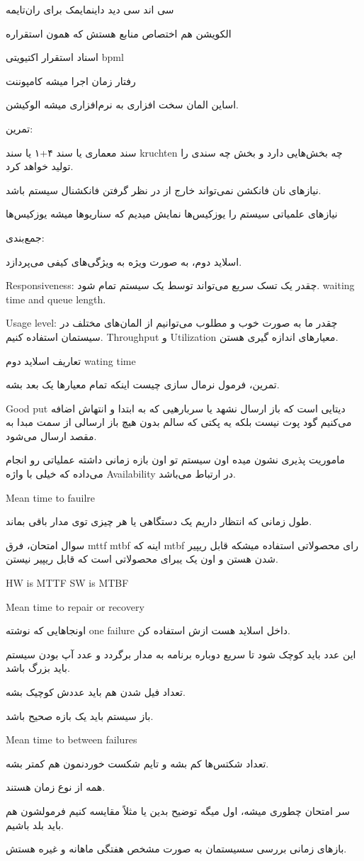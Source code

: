 سی اند سی دید داینمایمک برای ران‌تایمه

الکویشن هم اختصاص منابع هستش که همون استقراره

اسناد
استقرار
اکتیویتی
bpml

رفتار زمان اجرا میشه کامپوننت

اساین المان سخت افزاری به نرم‌افزاری میشه الوکیشن.

تمرین:

سند معماری یا سند ۴+۱ یا سند kruchten چه بخش‌هایی دارد و بخش چه سندی را تولید
خواهد کرد.

نیاز‌های نان فانکشن نمی‌تواند خارج از در نظر گرفتن فانکشنال سیستم باشد.

نیاز‌های علمیاتی سیستم را یوزکیس‌ها نمایش میدیم که سناریو‌ها میشه یوزکیس‌ها

جمع‌بندی:

اسلاید دوم، به صورت ویژه به ویژگی‌های کیفی می‌پردازد.

Responsiveness: چقدر یک تسک سریع می‌تواند توسط یک سیستم تمام شود. waiting time
and queue length.

Usage level: چقدر ما به صورت خوب و مطلوب می‌توانیم از المان‌های مختلف در سیستمان
استفاده کنیم. Throughput و Utilization معیار‌های اندازه گیری هستن.

تعاریف اسلاید دوم wating time

تمرین، فرمول نرمال سازی چیست اینکه تمام معیار‌ها یک بعد بشه.

Good put دیتایی است که باز ارسال نشهد یا سربارهیی که به ابتدا و انتهاش اضافه
می‌کنیم گود پوت نیست بلکه یه پکتی که سالم بدون هیچ باز ارسالی از سمت مبدا به
مقصد ارسال می‌شود.

ماموریت پذیری نشون میده اون سیستم تو اون بازه زمانی داشته عملیاتی رو انجام
می‌داده که خیلی با واژه Availability در ارتباط می‌باشد.

Mean time to fauilre

طول زمانی که انتظار داریم یک دستگاهی یا هر چیزی توی مدار باقی بماند.

سوال امتحان، فرق mttf mtbf اینه که mtbf رای محصولاتی استفاده میشکه قابل ریپیر
شدن هستن و اون یک یبرای محصولاتی است که قابل ریپیر نیستن.

HW is MTTF
SW is MTBF

Mean time to repair or recovery

اونجاهایی که نوشته one failure داخل اسلاید هست ازش استفاده کن.

این عدد باید کوچک شود تا سریع دوباره برنامه به مدار برگردد و عدد آپ بودن سیستم
باید بزرگ باشد.

تعداد فیل شدن هم باید عددش کوچیک بشه.

باز سیستم باید یک بازه صحیح باشد.

Mean time to between failures

تعداد شکتس‌ها کم بشه و تایم شکست خوردنمون هم کمتر بشه.

همه از نوع زمان‌ هستند.

سر امتحان چطوری میشه، اول میگه توضیح بدین یا مثلاً مقایسه کنیم فرمولشون هم باید
بلد باشیم.

باز‌های زمانی بررسی سسیستمان به صورت مشخص هفتگی ماهانه و غیره هستش.

